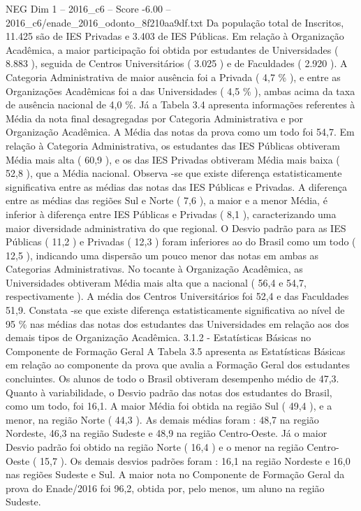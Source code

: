 \begin{textsample}{NEG Dim 1 – 2016\_c6 – Score -6.00 – 2016\_c6/enade\_2016\_odonto\_8f210aa9df.txt}
Da população total de Inscritos, 11.425 são de IES Privadas e 3.403 de IES Públicas.
Em relação à Organização Acadêmica, a maior participação foi obtida por estudantes de Universidades ( 8.883 ), seguida de Centros Universitários ( 3.025 ) e de Faculdades ( 2.920 ).
A Categoria Administrativa de maior ausência foi a Privada ( 4,7 \% ), e entre as Organizações Acadêmicas foi a das Universidades ( 4,5 \% ), ambas acima da taxa de ausência nacional de 4,0 \%.
Já a Tabela 3.4 apresenta informações referentes à Média da nota final desagregadas por Categoria Administrativa e por Organização Acadêmica.
A Média das notas da prova como um todo foi 54,7.
Em relação à Categoria Administrativa, os estudantes das IES Públicas obtiveram Média mais alta ( 60,9 ), e os das IES Privadas obtiveram Média mais baixa ( 52,8 ), que a Média nacional.
Observa -se que existe diferença estatisticamente significativa entre as médias das notas das IES Públicas e Privadas.
A diferença entre as médias das regiões Sul e Norte ( 7,6 ), a maior e a menor Média, é inferior à diferença entre IES Públicas e Privadas ( 8,1 ), caracterizando uma maior diversidade administrativa do que regional.
O Desvio padrão para as IES Públicas ( 11,2 ) e Privadas ( 12,3 ) foram inferiores ao do Brasil como um todo ( 12,5 ), indicando uma dispersão um pouco menor das notas em ambas as Categorias Administrativas.
No tocante à Organização Acadêmica, as Universidades obtiveram Média mais alta que a nacional ( 56,4 e 54,7, respectivamente ).
A média dos Centros Universitários foi 52,4 e das Faculdades 51,9.
Constata -se que existe diferença estatisticamente significativa ao nível de 95 \% nas médias das notas dos estudantes das Universidades em relação aos dos demais tipos de Organização Acadêmica. 3.1.2 - Estatísticas Básicas no Componente de Formação Geral A Tabela 3.5 apresenta as Estatísticas Básicas em relação ao componente da prova que avalia a Formação Geral dos estudantes concluintes.
Os alunos de todo o Brasil obtiveram desempenho médio de 47,3.
Quanto à variabilidade, o Desvio padrão das notas dos estudantes do Brasil, como um todo, foi 16,1.
A maior Média foi obtida na região Sul ( 49,4 ), e a menor, na região Norte ( 44,3 ).
As demais médias foram : 48,7 na região Nordeste, 46,3 na região Sudeste e 48,9 na região Centro-Oeste.
Já o maior Desvio padrão foi obtido na região Norte ( 16,4 ) e o menor na região Centro-Oeste ( 15,7 ).
Os demais desvios padrões foram : 16,1 na região Nordeste e 16,0 nas regiões Sudeste e Sul.
A maior nota no Componente de Formação Geral da prova do Enade/2016 foi 96,2, obtida por, pelo menos, um aluno na região Sudeste.

\end{textsample}

